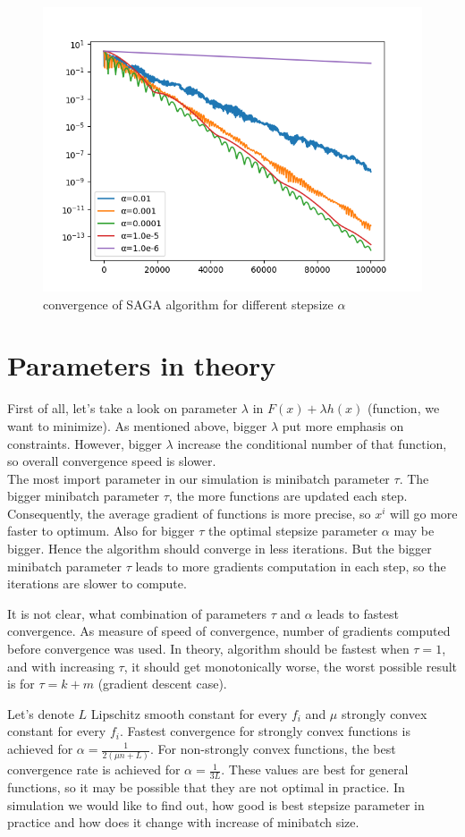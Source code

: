 \documentclass[11pt]{book}
\begin{document}
\begin{figure}[H]
	\centering
	\includegraphics[width=0.7\linewidth]{saga_convergence.png}
	\caption{convergence of SAGA algorithm for different stepsize $\alpha$}
	\label{fig:saga}
\end{figure}

\section{Parameters in theory}

First of all, let's take a look on parameter $\lambda$ in $F(x)+\lambda h(x)$ (function, we want to minimize). As mentioned above, bigger $\lambda$ put more emphasis on constraints. However, bigger $\lambda$ increase the conditional number of that function, so overall convergence speed is slower.\\

The most import parameter in our simulation is minibatch parameter $\tau$. The bigger minibatch parameter $\tau$, the more functions are updated each step. Consequently, the average gradient of functions is more precise, so $x^i$ will go more faster to optimum. Also for bigger $\tau$ the optimal stepsize parameter $\alpha$ may be bigger. Hence the algorithm should converge in less iterations. But the bigger minibatch parameter $\tau$ leads to more gradients computation in each step, so the iterations are slower to compute.

It is not clear, what combination of parameters $\tau$ and $\alpha$ leads to fastest convergence. As measure of speed of convergence, number of gradients computed before convergence was used. In theory, algorithm should be fastest when $\tau=1$, and with increasing $\tau$, it should get monotonically worse, the worst possible result is for $\tau = k+m$ (gradient descent case).

Let's denote $L$ Lipschitz smooth constant for every $f_i$ and $\mu$ strongly convex constant for every $f_i$. Fastest convergence for strongly convex functions is achieved for $\alpha = \frac{1}{2(\mu n + L)}$. For non-strongly convex functions, the best convergence rate is achieved for $\alpha = \frac{1}{3L}$. These values are best for general functions, so it may be possible that they are not optimal in practice. In simulation we would like to find out, how good is best stepsize parameter in practice and how does it change with increase of minibatch size.
\end{document}

